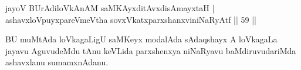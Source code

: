 \begin{shl}
jayoV BUrAdiloVkAnAM saMKAyxditAvxdisAmayxtaH |\\
ashavxloV\s puyxpareVmeV\s tha sovxVkatxparxshanxviniNaRyAtf \hfill || 59 || 
\end{shl}

\begin{artha}
BU muMtAda loVkagaLigU saMKeyx modalAda sAdaqshayx A loVkagaLa jayavu AguvudeMdu tAnu keVLida parxshenxya niNaRyavu baMdiruvudariMda ashavxlanu sumamxnAdanu.
\end{artha}

